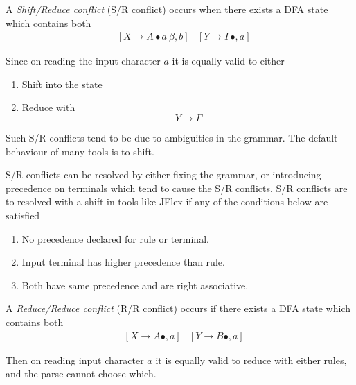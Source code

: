 \begin{definition}
    A \textit{Shift/Reduce conflict} (S/R conflict) occurs when there exists a DFA state which contains both
    \begin{align}
        &[X \to A \bullet a\ \beta, b]  &[Y \to \Gamma \bullet, a]
    \end{align}
    
    Since on reading the input character $a$ it is equally valid to either
    \begin{enumerate}
        \item Shift into the state
        \begin{equation}
            [X \to A\ a \bullet \beta, b]
        \end{equation}
        \item Reduce with
        \begin{equation}
            Y \to \Gamma
        \end{equation}
    \end{enumerate}
    
    Such S/R conflicts tend to be due to ambiguities in the grammar. The default behaviour of many tools is to shift.
\end{definition}

\begin{definition}
    S/R conflicts can be resolved by either fixing the grammar, or introducing precedence on terminals which tend to cause the S/R conflicts. S/R conflicts are to resolved with a shift in tools like JFlex if any of the conditions below are satisfied
    \begin{enumerate}
        \item No precedence declared for rule or terminal.
        \item Input terminal has higher precedence than rule.
        \item Both have same precedence and are right associative.
    \end{enumerate}
\end{definition}

\begin{definition}
    A \textit{Reduce/Reduce conflict} (R/R conflict) occurs if there exists a DFA state which contains both
    \begin{align}
        &[X \to A \bullet, a] &[Y \to B \bullet, a]
    \end{align}
    
    Then on reading input character $a$ it is equally valid to reduce with either rules, and the parse cannot choose which.
\end{definition}


